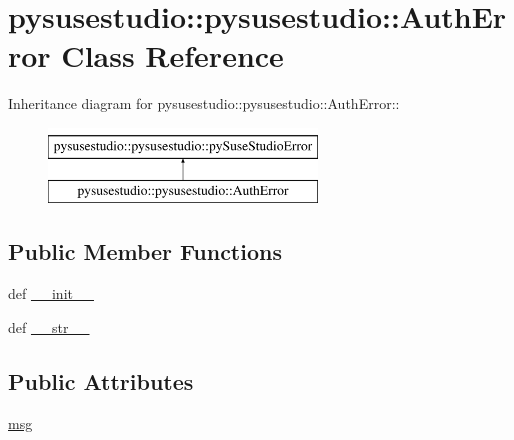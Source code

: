 \hypertarget{classpysusestudio_1_1pysusestudio_1_1_auth_error}{
\section{pysusestudio::pysusestudio::AuthError Class Reference}
\label{classpysusestudio_1_1pysusestudio_1_1_auth_error}
}
Inheritance diagram for pysusestudio::pysusestudio::AuthError::\begin{figure}[H]
\begin{center}
\leavevmode
\includegraphics[height=2cm]{classpysusestudio_1_1pysusestudio_1_1_auth_error}
\end{center}
\end{figure}
\subsection*{Public Member Functions}
\begin{DoxyCompactItemize}
\item 
def \hyperlink{classpysusestudio_1_1pysusestudio_1_1_auth_error_a8c6866fece204307992fe5ae3fc31326}{\_\-\_\-init\_\-\_\-}
\item 
def \hyperlink{classpysusestudio_1_1pysusestudio_1_1_auth_error_ae39d2b39c5c736257a3352b13002c54a}{\_\-\_\-str\_\-\_\-}
\end{DoxyCompactItemize}
\subsection*{Public Attributes}
\begin{DoxyCompactItemize}
\item 
\hyperlink{classpysusestudio_1_1pysusestudio_1_1_auth_error_a530b3891fcdb5847996cc733eb0ecf28}{msg}
\end{DoxyCompactItemize}


